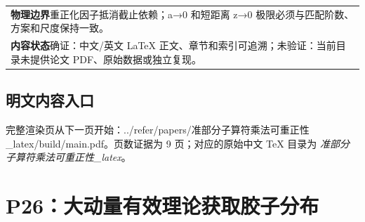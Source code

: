 \documentclass[UTF8,11pt,oneside]{ctexbook}
\begin{document}
\begin{table}[htbp]
\begin{tabular}{@{}p{}@{}}
    \textbf{物理边界}\quad 重正化因子抵消截止依赖；a→0 和短距离 z→0 极限必须与匹配阶数、方案和尺度保持一致。 \\
    \textbf{内容状态}\quad 确证：中文/英文 LaTeX 正文、章节和索引可追溯；未验证：当前目录未提供论文 PDF、原始数据或独立复现。 \\
    \bottomrule
  \end{tabular}
\end{table}
\section*{明文内容入口}
\noindent 完整渲染页从下一页开始：../\allowbreak{}refer/\allowbreak{}papers/\allowbreak{}准部分子算符乘法可重正性\_\allowbreak{}latex/\allowbreak{}build/\allowbreak{}main.pdf。页数证据为 9 页；对应的原始中文 TeX 目录为 \emph{准部分子算符乘法可重正性\_latex}。
\clearpage

\clearpage

\chapter{P26：大动量有效理论获取胶子分布}
\end{document}
